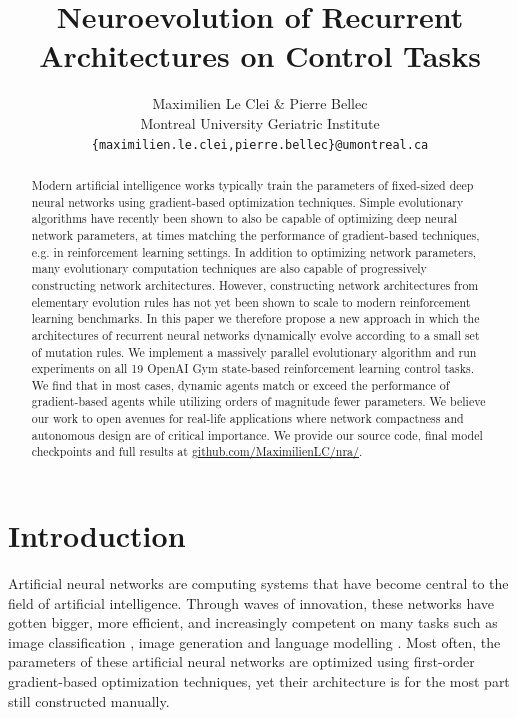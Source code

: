\documentclass{article} %
\title{Neuroevolution of Recurrent Architectures on Control Tasks}
\author{Maximilien Le Clei \& Pierre Bellec\\
Montreal University Geriatric Institute\\
\texttt{\{maximilien.le.clei,pierre.bellec\}@umontreal.ca}}
\begin{document}
\maketitle

\vspace{-1.3em}

\begin{abstract}
\vspace{-1em}
Modern artificial intelligence works typically train the parameters of fixed-sized deep neural networks using gradient-based optimization techniques. Simple evolutionary algorithms have recently been shown to also be capable of optimizing deep neural network parameters, at times matching the performance of gradient-based techniques, e.g. in reinforcement learning settings. In addition to optimizing network parameters, many evolutionary computation techniques are also capable of progressively constructing network architectures. However, constructing network architectures from elementary evolution rules has not yet been shown to scale to modern reinforcement learning benchmarks. In this paper we therefore propose a new approach in which the architectures of recurrent neural networks dynamically evolve according to a small set of mutation rules. We implement a massively parallel evolutionary algorithm and run experiments on all 19 \mbox{OpenAI} Gym state-based reinforcement learning control tasks. We find that in most cases, dynamic agents match or exceed the performance of gradient-based agents while utilizing orders of magnitude fewer parameters. We believe our work to open avenues for real-life applications where network compactness and autonomous design are of critical importance. We provide our source code, final model checkpoints and full results at \textcolor{blue}{\href{http://www.github.com/MaximilienLC/nra/}{github.com/MaximilienLC/nra/}}.
\end{abstract}

\vspace{-1.5em}
\section{Introduction}
\vspace{-1em}
Artificial neural networks are computing systems that have become central to the field of artificial intelligence. Through waves of innovation, these networks have gotten bigger, more efficient, and increasingly competent on many tasks such as image classification \citep{dai2021coatnet}, image generation \citep{ramesh2021zero} and language modelling \citep{rae2021scaling}. Most often, the parameters of these artificial neural networks are optimized using first-order gradient-based optimization techniques, yet their architecture is for the most part still constructed manually.
\end{document}
